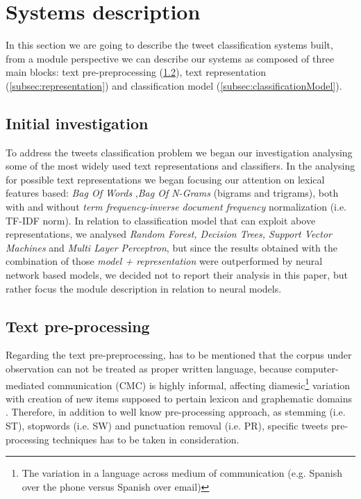 \section{Systems description} \label{sec:system}

In this section we are going to describe the tweet classification systems built, from a module perspective we can describe our systems as composed of three main blocks: text pre-preprocessing (\cref{subsec:preprocessing}),  text representation (\cref{subsec:representation}) and classification model (\cref{subsec:classificationModel}). 


\subsection{Initial investigation} \label{subsec:boh}
To address the tweets classification problem we began our investigation analysing some of the most widely used text representations and classifiers.
In the analysing for possible text representations we began focusing our attention on lexical features based: \emph{Bag Of Words} \cite{harris1954distributional},\emph{Bag Of N-Grams} (bigrams and trigrams), both with and without \emph{term frequency-inverse document frequency} normalization (i.e. TF-IDF norm).
In relation to classification model that can exploit above representations,  we analysed \emph{Random Forest, Decision Trees, Support Vector Machines} and \emph{Multi Layer Perceptron}, but since the results obtained with the combination of those \emph{model + representation} were outperformed by neural network based models, we decided not to report their analysis in this paper, but rather focus the module description in relation to neural models.


\subsection{Text pre-processing} \label{subsec:preprocessing}
Regarding the text pre-preprocessing, has to be mentioned that the corpus under observation can not be treated as proper written language, because computer-mediated communication (CMC) is highly informal, affecting diamesic\footnote{The variation in a language across medium of communication (e.g. Spanish over the phone versus Spanish over email)} variation with creation of new items supposed to pertain lexicon and graphematic domains \cite{bazzanella2011oscillazioni,cerruti2013netspeak}.
Therefore, in addition to well know pre-processing approach, as stemming (i.e. ST), stopwords (i.e. SW) and punctuation removal (i.e. PR), specific tweets pre-processing techniques has to be taken in consideration.

